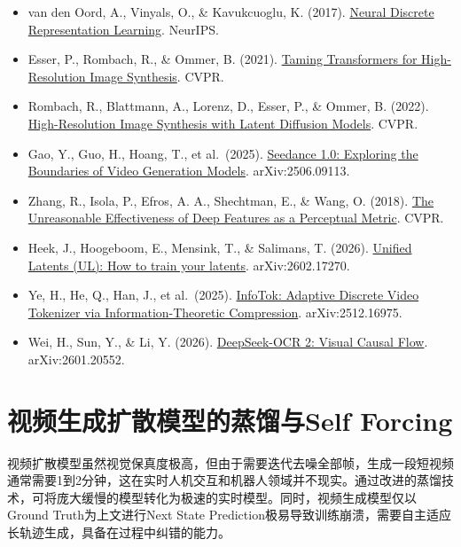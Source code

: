 \vspace{0.25em}
\begin{itemize}
\tightlist
\item
  van den Oord, A., Vinyals, O., \& Kavukcuoglu, K. (2017). \href{https://arxiv.org/abs/1711.00937}{Neural Discrete Representation Learning}. NeurIPS.
\item
  Esser, P., Rombach, R., \& Ommer, B. (2021). \href{https://arxiv.org/abs/2012.09841}{Taming Transformers for High-Resolution Image Synthesis}. CVPR.
\item
  Rombach, R., Blattmann, A., Lorenz, D., Esser, P., \& Ommer, B. (2022). \href{https://arxiv.org/abs/2112.10752}{High-Resolution Image Synthesis with Latent Diffusion Models}. CVPR.
\item
  Gao, Y., Guo, H., Hoang, T., et al.~(2025). \href{https://arxiv.org/abs/2506.09113}{Seedance 1.0: Exploring the Boundaries of Video Generation Models}. arXiv:2506.09113.
\item
  Zhang, R., Isola, P., Efros, A. A., Shechtman, E., \& Wang, O. (2018). \href{https://arxiv.org/abs/1801.03924}{The Unreasonable Effectiveness of Deep Features as a Perceptual Metric}. CVPR.
\item
  Heek, J., Hoogeboom, E., Mensink, T., \& Salimans, T. (2026). \href{https://arxiv.org/abs/2602.17270}{Unified Latents (UL): How to train your latents}. arXiv:2602.17270.
\item
  Ye, H., He, Q., Han, J., et al.~(2025). \href{https://arxiv.org/abs/2512.16975}{InfoTok: Adaptive Discrete Video Tokenizer via Information-Theoretic Compression}. arXiv:2512.16975.
\item
  Wei, H., Sun, Y., \& Li, Y. (2026). \href{https://arxiv.org/abs/2601.20552}{DeepSeek-OCR 2: Visual Causal Flow}. arXiv:2601.20552.
\end{itemize}

\clearpage

\hypertarget{ux89c6ux9891ux751fux6210ux6269ux6563ux6a21ux578bux7684ux84b8ux998fux4e0eself-forcing}{%
\section{视频生成扩散模型的蒸馏与Self Forcing}\label{ux89c6ux9891ux751fux6210ux6269ux6563ux6a21ux578bux7684ux84b8ux998fux4e0eself-forcing}}

视频扩散模型虽然视觉保真度极高，但由于需要迭代去噪全部帧，生成一段短视频通常需要1到2分钟，这在实时人机交互和机器人领域并不现实。通过改进的蒸馏技术，可将庞大缓慢的模型转化为极速的实时模型。同时，视频生成模型仅以Ground Truth为上文进行Next State Prediction极易导致训练崩溃，需要自主适应长轨迹生成，具备在过程中纠错的能力。

